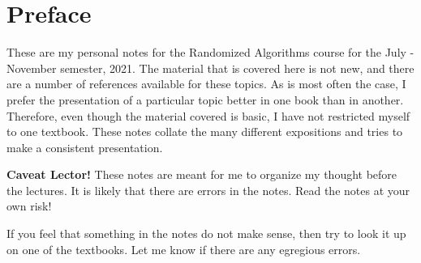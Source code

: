 \chapter*{Preface}

These are my personal notes for the Randomized Algorithms course for the July - November semester, 2021. The material that is covered here is not new, and there are a number of references available for these topics. As is most often the case, I prefer the presentation of a particular topic better in one book than in another. Therefore, even though the material covered is basic, I have not restricted myself to one textbook. These notes collate the many different expositions and tries to make a consistent presentation. 

\noindent \textbf{Caveat Lector!} These notes are meant for me to organize my thought before the lectures. It is likely that there are errors in the notes. Read the notes at your own risk! 

If you feel that something in the notes do not make sense, then try to look it up on one of the textbooks. Let me know if there are any egregious errors. 